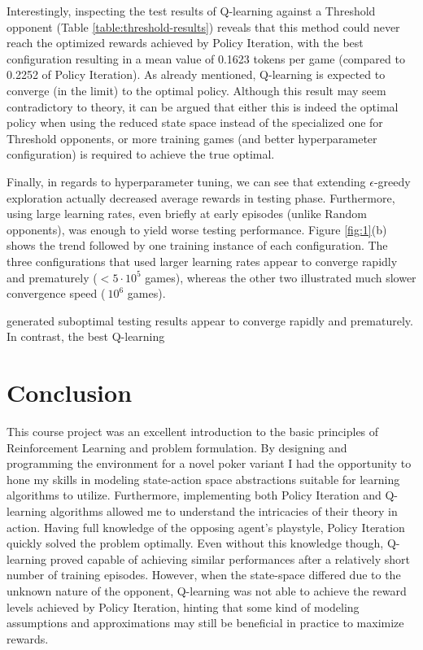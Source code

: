 Interestingly, inspecting the test results of Q-learning against a Threshold opponent (Table \ref{table:threshold-results}) reveals that this method could never reach the optimized rewards achieved by Policy Iteration, with the best configuration resulting in a mean value of 0.1623 tokens per game (compared to 0.2252 of Policy Iteration). As already mentioned, Q-learning is expected to converge (in the limit) to the optimal policy. Although this result may seem contradictory to theory, it can be argued that either this is indeed the optimal policy when using the reduced state space instead of the specialized one for Threshold opponents, or more training games (and better hyperparameter configuration) is required to achieve the true optimal.

Finally, in regards to hyperparameter tuning, we can see that extending $\epsilon$-greedy exploration actually decreased average rewards in testing phase. Furthermore, using large learning rates, even briefly at early episodes (unlike Random opponents), was enough to yield worse testing performance. Figure \ref{fig:1}(b) shows the trend followed by one training instance of each configuration. The three configurations that used larger learning rates appear to converge rapidly and prematurely ($<5\cdot10^5$ games), whereas the other two illustrated much slower convergence speed ($~10^6$ games).

generated suboptimal testing results appear to converge rapidly and prematurely. In contrast, the best Q-learning 

\section{Conclusion}

This course project was an excellent introduction to the basic principles of Reinforcement Learning and problem formulation. By designing and programming the environment for a novel poker variant I had the opportunity to hone my skills in modeling state-action space abstractions suitable for learning algorithms to utilize. Furthermore, implementing both Policy Iteration and Q-learning algorithms allowed me to understand the intricacies of their theory in action. Having full knowledge of the opposing agent's playstyle, Policy Iteration quickly solved the problem optimally. Even without this knowledge though, Q-learning proved capable of achieving similar performances after a relatively short number of training episodes. However, when the state-space differed due to the unknown nature of the opponent, Q-learning was not able to achieve the reward levels achieved by Policy Iteration, hinting that some kind of modeling assumptions and approximations may still be beneficial in practice to maximize rewards.

